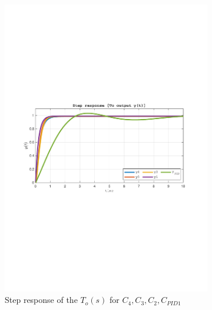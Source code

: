 \documentclass[a4paper, 12pt]{article}
\begin{document}
\begin{figure}[h!]
 \begin{subfigure}[t]{0.8\textwidth}
    \includegraphics[width=\textwidth]
    {Figures/fig04a.pdf}
    \caption{Step response of the $T_o(s)$ for $C_4, C_3, C_2, C_{PID1}$}
    \label{fig:fig04a}
    \end{subfigure}
    \begin{subfigure}[t]{0.45\textwidth}

\end{subfigure}
\end{figure}
\end{document}

